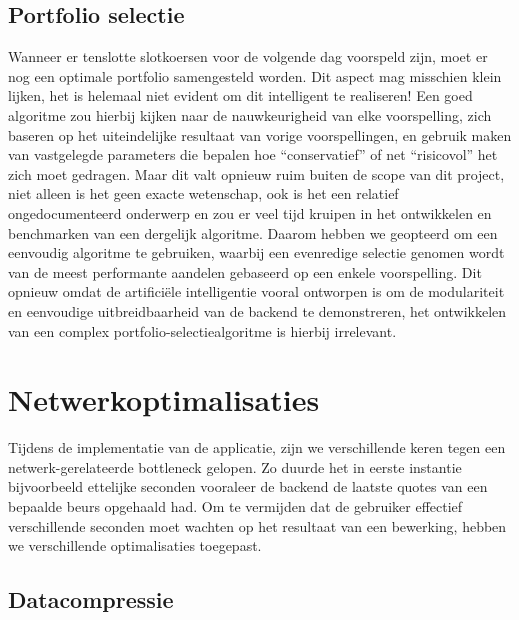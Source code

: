 \section{Portfolio selectie}

Wanneer er tenslotte slotkoersen voor de volgende dag voorspeld zijn, moet er nog een optimale portfolio samengesteld worden. Dit aspect mag misschien klein lijken, het is helemaal niet evident om dit intelligent te realiseren! Een goed algoritme zou hierbij kijken naar de nauwkeurigheid van elke voorspelling, zich baseren op het uiteindelijke resultaat van vorige voorspellingen, en gebruik maken van vastgelegde parameters die bepalen hoe ``conservatief'' of net ``risicovol'' het zich moet gedragen. Maar dit valt opnieuw ruim buiten de scope van dit project, niet alleen is het geen exacte wetenschap, ook is het een relatief ongedocumenteerd onderwerp en zou er veel tijd kruipen in het ontwikkelen en benchmarken van een dergelijk algoritme. Daarom hebben we geopteerd om een eenvoudig algoritme te gebruiken, waarbij een evenredige selectie genomen wordt van de meest performante aandelen gebaseerd op een enkele voorspelling. Dit opnieuw omdat de artifici\"ele intelligentie vooral ontworpen is om de modulariteit en eenvoudige uitbreidbaarheid van de backend te demonstreren, het ontwikkelen van een complex portfolio-selectiealgoritme is hierbij irrelevant.


%
%

\chapter{Netwerkoptimalisaties}

Tijdens de implementatie van de applicatie, zijn we verschillende keren tegen een netwerk-gerelateerde bottleneck gelopen. Zo duurde het in eerste instantie bijvoorbeeld ettelijke seconden vooraleer de backend de laatste quotes van een bepaalde beurs opgehaald had. Om te vermijden dat de gebruiker effectief verschillende seconden moet wachten op het resultaat van een bewerking, hebben we verschillende optimalisaties toegepast.


\section{Datacompressie}

